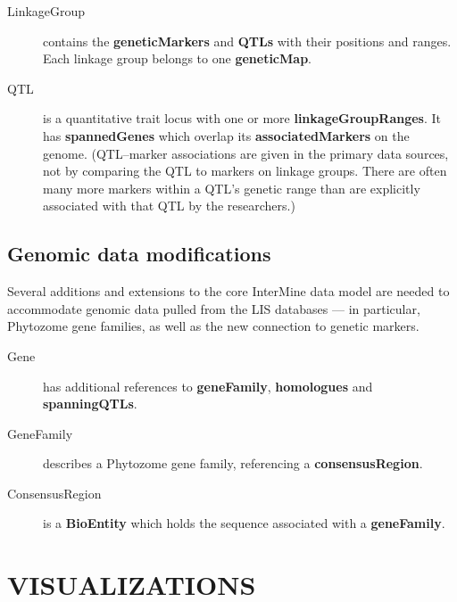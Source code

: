 \documentclass[]{pagposter}
\begin{document}
\begin{multicols*}{3}
\begin{description}
    \item[LinkageGroup] contains the \textbf{geneticMarkers} and \textbf{QTLs} with their positions and ranges. Each linkage group belongs to one \textbf{geneticMap}.
      
    \item[QTL] is a quantitative trait locus with one or more \textbf{linkageGroupRanges}. It has \textbf{spannedGenes} which overlap its \textbf{associatedMarkers} on the genome.
      (QTL--marker associations are given in the primary data sources, not by comparing the QTL to markers on linkage groups. There are often many more markers within a QTL's genetic range than are explicitly
      associated with that QTL by the researchers.)

  \end{description}

  \subsection*{Genomic data modifications}

  Several additions and extensions to the core InterMine data model are needed to accommodate genomic data pulled from the LIS databases ---
  in particular, Phytozome gene families, as well as the new connection to genetic markers.

  \begin{description}

    \item[Gene] has additional references to \textbf{geneFamily}, \textbf{homologues} and \textbf{spanningQTLs}.

    \item[GeneFamily] describes a Phytozome gene family, referencing a \textbf{consensusRegion}.

    \item[ConsensusRegion] is a \textbf{BioEntity} which holds the sequence associated with a \textbf{geneFamily}.

  \end{description}


  \section*{VISUALIZATIONS}


\end{multicols*}
\end{document}
